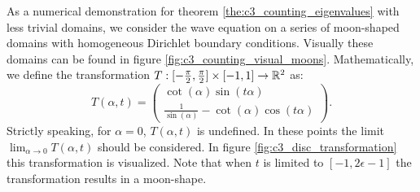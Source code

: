 As a numerical demonstration for theorem \ref{the:c3_counting_eigenvalues} with less trivial domains, we consider the wave equation on a series of moon-shaped domains with homogeneous Dirichlet boundary conditions. Visually these domains can be found in figure \ref{fig:c3_counting_visual_moons}. Mathematically, we define the transformation $T:[-\frac{\pi}{2}, \frac{\pi}{2}] \times [-1, 1] \to \mathbb{R}^2$ as:
\begin{equation}\label{equ:c3_disc_transformation}
  T(\alpha, t) = \begin{pmatrix}
    \cot(\alpha) \sin(t \alpha) \\
    \frac{1}{\sin(\alpha)} - \cot(\alpha) \cos(t \alpha)
  \end{pmatrix}\text{.}
\end{equation}
Strictly speaking, for $\alpha = 0$,  $T(\alpha, t)$ is undefined. In these points the limit $\lim_{\alpha \to 0} T(\alpha, t)$ should be considered. In figure \ref{fig:c3_disc_transformation} this transformation is visualized. Note that when $t$ is limited to $[-1, 2\epsilon -1]$ the transformation results in a moon-shape.


